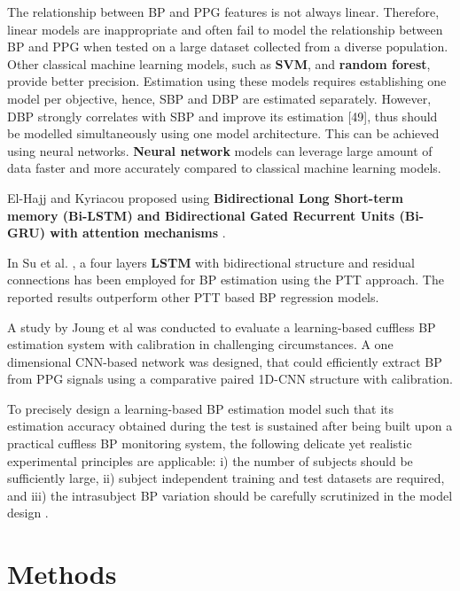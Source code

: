 \documentclass[12pt, bibliography=totoc]{scrartcl}
\begin{document}
The relationship between BP and PPG features is not always linear. Therefore, linear models are inappropriate and often fail to model the relationship between BP and PPG when tested on a large dataset collected from a diverse population. Other classical machine learning models, such as \textbf{SVM}, and \textbf{random forest}, provide better precision. Estimation using these models requires establishing one model per objective, hence, SBP and DBP are estimated separately. However, DBP strongly correlates with SBP and improve its estimation [49], thus should be modelled simultaneously using one model architecture. This can be achieved using neural networks. \textbf{Neural network} models can leverage large amount of data faster and more accurately compared to classical machine learning models.

El-Hajj and Kyriacou proposed using \textbf{Bidirectional Long Short-term memory (Bi-LSTM) and Bidirectional Gated Recurrent Units (Bi-GRU) with attention mechanisms} \cite{el-hajjDeepLearningModels2021}.

In Su et al. \cite{suLongtermBloodPressure2018}, a four layers \textbf{LSTM} with bidirectional structure and residual connections has been employed for BP estimation using the PTT approach. The reported results outperform other PTT based BP regression models.

A study by Joung et al \cite{joungContinuousCufflessBlood2023} was conducted to evaluate a learning-based cuffless BP estimation system with calibration in challenging circumstances. A one dimensional CNN-based network was designed, that could efficiently extract BP from PPG signals using a comparative paired 1D-CNN structure with calibration. 

To precisely design a learning-based BP estimation model such that its estimation accuracy obtained during the test is sustained after being built upon a practical cuffless BP monitoring system, the following delicate yet realistic experimental principles are applicable: i) the number of subjects should be sufficiently large, ii) subject independent training and test datasets are required, and iii) the intrasubject BP variation should be carefully scrutinized in the model design \cite{joungContinuousCufflessBlood2023}.

\section{Methods}
\label{methods}
\end{document}
